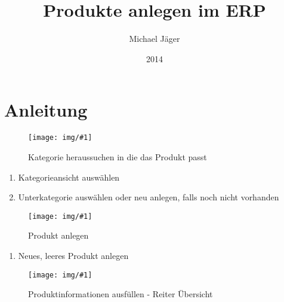 \documentclass{\basedir/fablab-document}
\date{2014}
\author{Michael Jäger}
\title{Produkte anlegen im ERP}
\newcommand{\img}[2]{
	\begin{figure}[ht]%
	\texttt{[image: img/\#1]}%
	\caption{#2}%
	\end{figure}}
\begin{document}
\section{Anleitung}

\img{01_Kategorie_heraussuchen.pdf}{Kategorie heraussuchen in die das Produkt passt}
\begin{enumerate}
	\item Kategorieansicht auswählen
	\item Unterkategorie auswählen oder neu anlegen, falls noch nicht vorhanden
\end{enumerate}

\newpage
\img{02_Produkt_anlegen.pdf}{Produkt anlegen}
\begin{enumerate}
	\item Neues, leeres Produkt anlegen
\end{enumerate}

\newpage
\img{03_Produkt_Informationen.pdf}{Produktinformationen ausfüllen - Reiter Übersicht}
\end{document}
